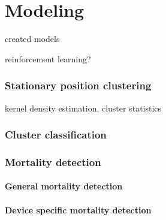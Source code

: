 
\chapter{Modeling}

created models

reinforcement learning?


\subsection{Stationary position clustering}

kernel density estimation, cluster statistics

\subsection{Cluster classification}

\subsection{Mortality detection}

\subsubsection{General mortality detection}

\subsubsection{Device specific mortality detection}
